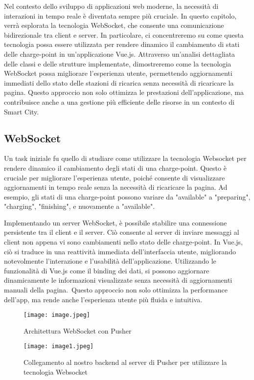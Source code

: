 Nel contesto dello sviluppo di applicazioni web moderne, la necessità di interazioni in tempo reale è diventata sempre più cruciale. In questo capitolo, verrà esplorata la tecnologia WebSocket, che consente una comunicazione bidirezionale tra client e server. In particolare, ci concentreremo su come questa tecnologia possa essere utilizzata per rendere dinamico il cambiamento di stati delle charge-point in un'applicazione Vue.js. Attraverso un'analisi dettagliata delle classi e delle strutture implementate, dimostreremo come la tecnologia WebSocket possa migliorare l'esperienza utente, permettendo aggiornamenti immediati dello stato delle stazioni di ricarica senza necessità di ricaricare la pagina. Questo approccio non solo ottimizza le prestazioni dell'applicazione, ma contribuisce anche a una gestione più efficiente delle risorse in un contesto di Smart City.

\subsection{WebSocket}
Un task iniziale fu quello di studiare come utilizzare la tecnologia Websocket per rendere dinamico il cambiamento degli stati di una charge-point. Questo è cruciale per migliorare l’esperienza utente, poiché consente di visualizzare aggiornamenti in tempo reale senza la necessità di ricaricare la pagina. Ad esempio, gli stati di una charge-point possono variare da "available" a "preparing", "charging", "finishing", e nuovamente a "available".

Implementando un server WebSocket, è possibile stabilire una connessione persistente tra il client e il server. Ciò consente al server di inviare messaggi al client non appena vi sono cambiamenti nello stato delle charge-point. In Vue.js, ciò si traduce in una reattività immediata dell'interfaccia utente, migliorando notevolmente l'interazione e l'usabilità dell'applicazione. Utilizzando le funzionalità di Vue.js come il binding dei dati, si possono aggiornare dinamicamente le informazioni visualizzate senza necessità di aggiornamenti manuali della pagina.\
Questo approccio non solo ottimizza la performance dell'app, ma rende anche l'esperienza utente più fluida e intuitiva. 
\begin{figure}[h]
    \centering
    \texttt{[image: image.jpeg]}
    \caption{Architettura WebSocket con Pusher}
    \label{fig:websocket_architecture} 
    \vspace{0.3cm} %
    \texttt{[image: image1.jpeg]}
    \caption{Collegamento al nostro backend al server di Pusher per utilizzare la tecnologia Websocket}
    \label{fig:websocket_architecture}
 
\end{figure}
\newpage

